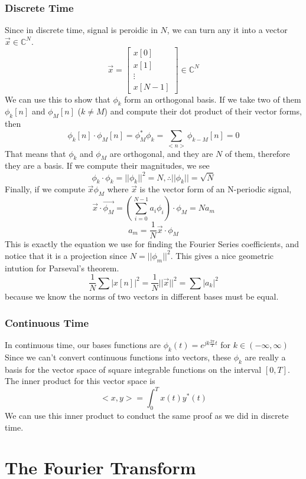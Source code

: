 \documentclass{article}
\begin{document}
\subsubsection{Discrete Time}
Since in discrete time, signal is peroidic in $N$, we can turn any it into a vector $\vec{x}\in \mathbb{C}^N$.
\[
    \vec{x} = \left[
        \begin{array}{c}
            x[0]\\
            x[1]\\
            \vdots\\
            x[N-1]
        \end{array}
    \right] \in \mathbb{C}^N
\]
We can use this to show that $\phi_k$ form an orthogonal basis.
If we take two of them $\phi_k[n]$ and $\phi_M[n]$ ($k\ne M$) and compute their dot product of their vector forms, then
$$\phi_k[n] \cdot \phi_M[n] = \phi_M^*\phi_k = \sum_{<n>}{\phi_{k-M}[n]} = 0$$
That means that $\phi_k$ and $\phi_M$ are orthogonal, and they are $N$ of them, therefore they are a basis.
If we compute their magnitudes, we see
$$\phi_k \cdot \phi_k = ||\phi_k||^2 = N, \therefore ||\phi_k|| = \sqrt{N}$$
Finally, if we compute $\vec{x}\phi_M$ where $\vec{x}$ is the vector form of an N-periodic signal,
$$\vec{x}\cdot \vec{\phi_M} = (\sum_{i=0}^{N-1}{a_i\phi_i})\cdot \phi_M = Na_m$$
$$a_m = \frac{1}{N}\vec{x}\cdot \phi_M$$
This is exactly the equation we use for finding the Fourier Series coefficients, and notice that it is a
projection since $N = ||\phi_m||^2$. This gives a nice geometric intution for Parseval's theorem.
$$\frac{1}{N}\sum{|x[n]|^2} = \frac{1}{N}||\vec{x}||^2 = \sum{|a_k|^2}$$
because we know the norms of two vectors in different bases must be equal.
\subsubsection{Continuous Time}
In continuous time, our bases functions are $\phi_k(t) = e^{jk\frac{2\pi}{T}t}$ for $k \in (-\infty, \infty)$
Since we can't convert continuous functions into vectors, these $\phi_k$ are really a basis for the vector space
of square integrable functions on the interval $[0, T]$.
The inner product for this vector space is 
$$<x, y> = \int_{0}^{T}{x(t)y^*(t)}$$
We can use this inner product to conduct the same proof as we did in discrete time.
\section{The Fourier Transform}
\end{document}
